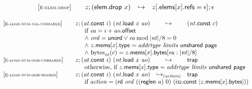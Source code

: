 \vspace{1ex}

$$
\begin{array}[t]{@{}lrcl@{}l@{}}
{[\textsc{\scriptsize E{-}elem.drop}]} \quad & z ; (\mathsf{elem{.}drop}~x) & \hookrightarrow & z{}[{.}\mathsf{elems}{}[x]{.}\mathsf{refs} = \epsilon] ; \epsilon \\
\end{array}
$$

\vspace{1ex}

$$
\begin{array}[t]{@{}lrcl@{}l@{}}
{[\textsc{\scriptsize E{-}load{-}num{-}val{-}unshared}]} \quad & z ; ({\mathit{at}}{.}\mathsf{const}~i)~({\mathit{nt}}{.}\mathsf{load}~x~{\mathit{ao}}) & \hookrightarrow & ({\mathit{nt}}{.}\mathsf{const}~c) &  \\
& \multicolumn{4}{@{}l@{}}{\quad
\quad
\begin{array}[t]{@{}l@{}}
\mbox{if}~ {\mathit{ea}} = i + {\mathit{ao}}{.}\mathsf{offset} \\
{\land}~ {\mathit{ord}} = \mathsf{unord} \lor {\mathit{ea}} \mathbin{\mathrm{mod}} {|{\mathit{nt}}|} / 8 = 0 \\
{\land}~ z{.}\mathsf{mems}{}[x]{.}\mathsf{type} = {\mathit{addrtype}}~{\mathit{limits}}~\mathsf{unshared}~\mathsf{page} \\
{\land}~ {{\mathrm{bytes}}}_{{\mathit{nt}}}(c) = z{.}\mathsf{mems}{}[x]{.}\mathsf{bytes}{}[{\mathit{ea}} : {|{\mathit{nt}}|} / 8] \\
\end{array}
} \\
{[\textsc{\scriptsize E{-}load{-}num{-}oob{-}unshared}]} \quad & z ; ({\mathit{at}}{.}\mathsf{const}~i)~({\mathit{nt}}{.}\mathsf{load}~x~{\mathit{ao}}) & \hookrightarrow & \mathsf{trap} &  \\
& \multicolumn{4}{@{}l@{}}{\quad
\quad \mbox{otherwise, if}~ z{.}\mathsf{mems}{}[x]{.}\mathsf{type} = {\mathit{addrtype}}~{\mathit{limits}}~\mathsf{unshared}~\mathsf{page}
} \\
{[\textsc{\scriptsize E{-}load{-}num{-}oob{-}shared}]} \quad & z ; ({\mathit{at}}{.}\mathsf{const}~i)~({\mathit{nt}}{.}\mathsf{load}~x~{\mathit{ao}}) & {\hookrightarrow}_{({\mathit{action}})} {} & \mathsf{trap} &  \\
& \multicolumn{4}{@{}l@{}}{\quad
\quad
\begin{array}[t]{@{}l@{}}
\mbox{if}~ {\mathit{action}} = (\mathsf{rd}~{\mathit{ord}}~((\mathsf{reglen}~a)~0)~(\mathsf{i{\scriptstyle 32}}{.}\mathsf{const}~{|z{.}\mathsf{mems}{}[x]{.}\mathsf{bytes}|})) \\

\end{array}}
\end{array}$$

